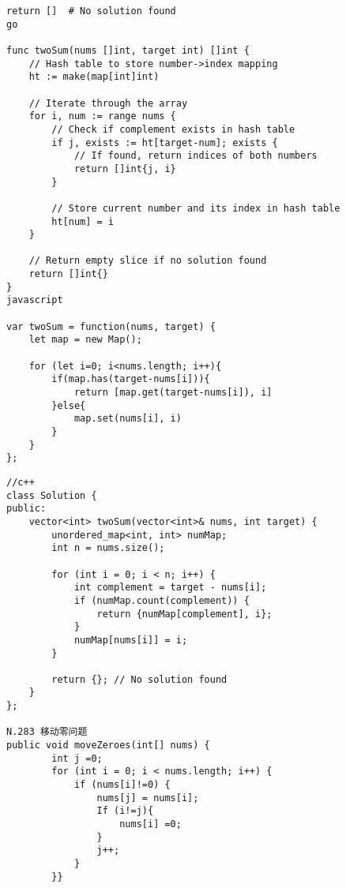 \documentclass[10pt]{article}
\begin{document}
\begin{multicols}{2}
\begin{lstlisting}[style=java, caption={}]
        return []  # No solution found
go

func twoSum(nums []int, target int) []int {
    // Hash table to store number->index mapping
    ht := make(map[int]int)

    // Iterate through the array
    for i, num := range nums {
        // Check if complement exists in hash table
        if j, exists := ht[target-num]; exists {
            // If found, return indices of both numbers
            return []int{j, i}
        }

        // Store current number and its index in hash table
        ht[num] = i
    }

    // Return empty slice if no solution found
    return []int{}
}
javascript

var twoSum = function(nums, target) {
    let map = new Map();

    for (let i=0; i<nums.length; i++){
        if(map.has(target-nums[i])){
            return [map.get(target-nums[i]), i]
        }else{
            map.set(nums[i], i)
        }
    }
};

\end{lstlisting}

\end{multicols}

\newpage
\begin{multicols}{2}
\begin{lstlisting}[style=java, caption={}]
//c++
class Solution {
public:
    vector<int> twoSum(vector<int>& nums, int target) {
        unordered_map<int, int> numMap;
        int n = nums.size();

        for (int i = 0; i < n; i++) {
            int complement = target - nums[i];
            if (numMap.count(complement)) {
                return {numMap[complement], i};
            }
            numMap[nums[i]] = i;
        }

        return {}; // No solution found
    }
};

N.283 移动零问题
public void moveZeroes(int[] nums) {
        int j =0;
        for (int i = 0; i < nums.length; i++) {
            if (nums[i]!=0) {
                nums[j] = nums[i];
                If (i!=j){
                    nums[i] =0;
                }
                j++;
            }
        }}
\end{lstlisting}
\end{multicols}
\end{document}
